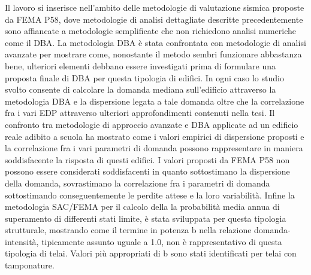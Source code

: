 Il lavoro si inserisce nell’ambito delle metodologie di valutazione sismica proposte da FEMA P58, dove metodologie di analisi dettagliate descritte precedentemente sono affiancate a metodologie semplificate che non richiedono analisi numeriche come il DBA. La metodologia DBA è stata confrontata con metodologie di analisi avanzate per mostrare come, nonostante il metodo sembri funzionare abbastanza bene, ulteriori elementi debbano essere investigati prima di formulare una proposta finale di DBA per questa tipologia di edifici. In ogni caso lo studio svolto consente di calcolare la domanda mediana sull’edificio attraverso la metodologia DBA e la dispersione legata a tale domanda oltre che la correlazione fra i vari EDP attraverso ulteriori approfondimenti contenuti nella tesi. Il confronto tra metodologie di approccio avanzate e DBA applicate ad un edificio reale adibito a scuola ha mostrato come i valori empirici di dispersione proposti e la correlazione fra i vari parametri di domanda possono rappresentare in maniera soddisfacente la risposta di questi edifici. I valori proposti da FEMA P58 non possono essere considerati soddisfacenti in quanto sottostimano la dispersione della domanda, sovrastimano la correlazione fra i parametri di domanda sottostimando conseguentemente le perdite attese e la loro variabilità. 
Infine la metodologia SAC/FEMA per il calcolo della la probabilità media annua di superamento di differenti stati limite, è stata sviluppata per questa tipologia strutturale, mostrando come il termine in potenza b nella relazione domanda-intensità, tipicamente assunto uguale a 1.0, non è rappresentativo di questa tipologia di telai. Valori più appropriati di b sono stati identificati per telai con tamponature.
